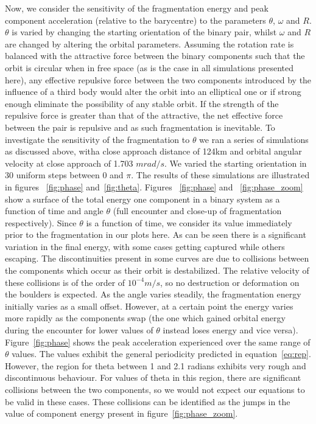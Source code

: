 \documentclass[letterpaper, preprint, paper,11pt]{AAS}	%
\begin{document}
Now, we consider the sensitivity of the fragmentation energy and peak component acceleration (relative to the barycentre) to the parameters $\theta$, $\omega$ and $R$. $\theta$ is varied by changing the starting orientation of the binary pair, whilst $\omega$ and $R$ are changed by altering the orbital parameters. Assuming the rotation rate is balanced with the attractive force between the binary components such that the orbit is circular when in free space (as is the case in all simulations presented here), any effective repulsive force between the two components introduced by the influence of a third body would alter the orbit into an elliptical one or if strong enough eliminate the possibility of any stable orbit. If the strength of the repulsive force is greater than that of the attractive, the net effective force between the pair is repulsive and as such fragmentation is inevitable. 
To investigate the sensitivity of the fragmentation to $\theta$ we ran a series of simulations as discussed above, witha close approach distance of 124km and orbital angular velocity at close approach of 1.703 $mrad/s$. We varied the starting orientation in 30 uniform steps between 0 and $\pi$. The results of these simulations are illustrated in figures ~\ref{fig:phase} and~\ref{fig:theta}. Figures ~\ref{fig:phase} and ~\ref{fig:phase_zoom} show a surface of the total energy one component in a binary system as a function of time and angle $\theta$ (full encounter and close-up of fragmentation respectively). Since $\theta$ is a function of time, we consider its value immediately prior to the fragmentation in our plots here.
As can be seen there is a significant variation in the final energy, with some cases getting captured while others escaping. The discontinuities present in some curves are due to collisions between the components which occur as their orbit is destabilized. The relative velocity of these collisions is of the order of $10^{-4}m/s$,  so no destruction or deformation on the boulders is expected. As the angle varies steadily, the fragmentation energy initially varies as a small offset. However, at a certain point the energy varies more rapidly as the components swap (the one which gained orbital energy during the encounter for lower values of $\theta$ instead loses energy and vice versa). Figure~\ref{fig:phase} shows the peak acceleration experienced over the same range of $\theta$ values. The values exhibit the general periodicity predicted in equation~\ref{eq:rep}. However, the region for theta between 1 and 2.1 radians exhibits very rough and discontinuous behaviour. For values of theta in this region, there are significant collisions between the two components, so we would not expect our equations to be valid in these cases. These collisions can be identified as the jumps in the value of component energy present in figure~\ref{fig:phase_zoom}.
\end{document}
